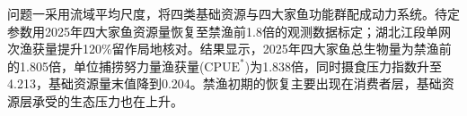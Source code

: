 问题一采用流域平均尺度，将四类基础资源与四大家鱼功能群配成动力系统。待定参数用2025年四大家鱼资源量恢复至禁渔前1.8倍的观测数据标定；湖北江段单网次渔获量提升120\%留作局地核对。结果显示，2025年四大家鱼总生物量为禁渔前的1.805倍，单位捕捞努力量渔获量($\mathrm{CPUE}^*$)为1.838倍，同时摄食压力指数升至4.213，基础资源量末值降到0.204。禁渔初期的恢复主要出现在消费者层，基础资源层承受的生态压力也在上升。
